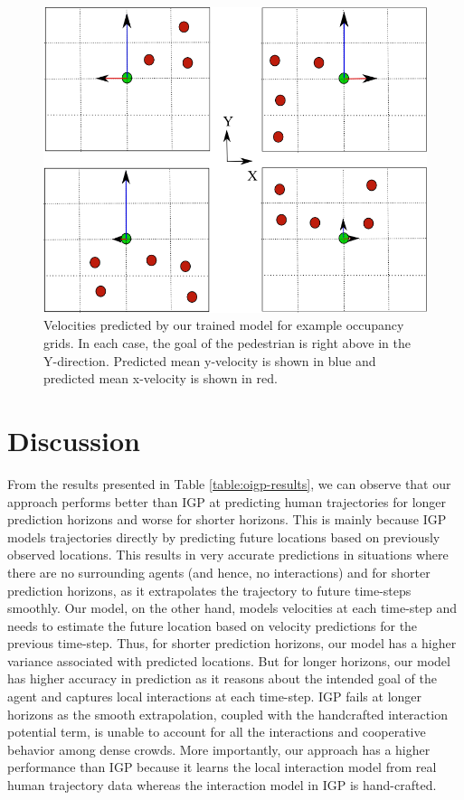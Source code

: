 \begin{figure}[t!]
  \centering
  \includegraphics[width=\linewidth]{Figures/sample-ogrid.png}
  \caption{Velocities predicted by our trained model for example occupancy grids. In each case, the goal of the pedestrian is right above in the Y-direction. Predicted mean y-velocity is shown in blue and predicted mean x-velocity is shown in red.}
  \label{fig:oigp-learnedmodel}
\end{figure}

\section{Discussion}
\label{sec:oigp-discussion}

From the results presented in Table \ref{table:oigp-results}, we can
observe that our approach performs better than IGP at predicting human
trajectories for longer prediction horizons and worse for shorter
horizons. This is mainly because IGP models trajectories directly by
predicting future locations based on previously observed locations. This
results in very accurate predictions in situations where there are no
surrounding agents (and hence, no interactions) and for shorter
prediction horizons, as it extrapolates the trajectory to future
time-steps smoothly. Our model, on the other hand, models velocities
at each time-step and needs to estimate the future location based on
velocity predictions for the previous time-step. Thus, for shorter
prediction horizons, our model has a higher variance associated with
predicted locations. But for longer horizons, our model has higher
accuracy in prediction as it reasons about the intended goal of the
agent and captures local interactions at each time-step. IGP fails at
longer horizons as the smooth extrapolation, coupled with the
handcrafted interaction potential term, is unable to account for all
the interactions and cooperative behavior among dense crowds. More
importantly, our approach has a higher performance than IGP because it
learns the local interaction model from real human trajectory data
whereas the interaction model in IGP is hand-crafted.

